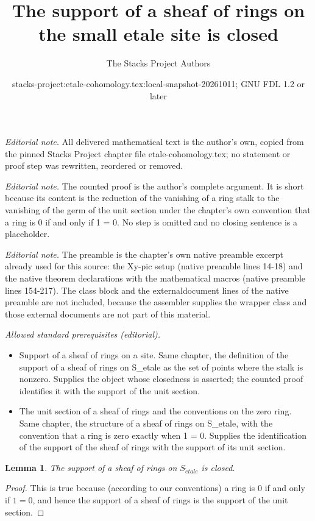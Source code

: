 \documentclass[10pt,a4paper]{amsart}
\title{The support of a sheaf of rings on the small etale site is closed}
\author{The Stacks Project Authors}
\date{stacks-project:etale-cohomology.tex:local-snapshot-20261011; GNU FDL 1.2 or later}
\theoremstyle{plain}
\newtheorem{lemma}[subsection]{Lemma}
\theoremstyle{definition}
\theoremstyle{remark}
\numberwithin{equation}{subsection}
\def\etale{{\acute{e}tale}}
\begin{document}
\maketitle
\noindent\textit{Editorial note.} All delivered mathematical text is the author's own, copied from the pinned Stacks Project chapter file etale-cohomology.tex; no statement or proof step was rewritten, reordered or removed.\par\medskip
\noindent\textit{Editorial note.} The counted proof is the author's complete argument. It is short because its content is the reduction of the vanishing of a ring stalk to the vanishing of the germ of the unit section under the chapter's own convention that a ring is 0 if and only if 1 = 0. No step is omitted and no closing sentence is a placeholder.\par\medskip
\noindent\textit{Editorial note.} The preamble is the chapter's own native preamble excerpt already used for this source: the Xy-pic setup (native preamble lines 14-18) and the native theorem declarations with the mathematical macros (native preamble lines 154-217). The class block and the externaldocument lines of the native preamble are not included, because the assembler supplies the wrapper class and those external documents are not part of this material.\par\medskip
\noindent\textit{Allowed standard prerequisites (editorial).}\begin{itemize}
\item Support of a sheaf of rings on a site. Same chapter, the definition of the support of a sheaf of rings on S\_etale as the set of points where the stalk is nonzero. Supplies the object whose closedness is asserted; the counted proof identifies it with the support of the unit section.
\item The unit section of a sheaf of rings and the conventions on the zero ring. Same chapter, the structure of a sheaf of rings on S\_etale, with the convention that a ring is zero exactly when 1 = 0. Supplies the identification of the support of the sheaf of rings with the support of its unit section.
\end{itemize}\medskip
\begin{lemma}
\label{lemma-support-sheaf-rings-closed}
The support of a sheaf of rings on $S_\etale$ is closed.
\end{lemma}

\begin{proof}
This is true because (according to our conventions)
a ring is $0$ if and only if
$1 = 0$, and hence the support of a sheaf of rings
is the support of the unit section.
\end{proof}
\end{document}

